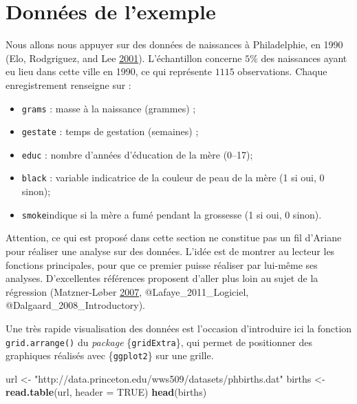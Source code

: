 \documentclass[
  11pt,
]{book}
\newenvironment{Shaded}{\begin{snugshade}}{\end{snugshade}}
\newcommand{\DataTypeTok}[1]{\textcolor[rgb]{0.13,0.29,0.53}{#1}}
\newcommand{\KeywordTok}[1]{\textcolor[rgb]{0.13,0.29,0.53}{\textbf{#1}}}
\newcommand{\NormalTok}[1]{#1}
\newcommand{\OtherTok}[1]{\textcolor[rgb]{0.56,0.35,0.01}{#1}}
\newcommand{\StringTok}[1]{\textcolor[rgb]{0.31,0.60,0.02}{#1}}
\providecommand{\tightlist}{%
  \setlength{\itemsep}{0pt}\setlength{\parskip}{0pt}}
\numberwithin{equation}{section}
\numberwithin{countremarque}{section}
\begin{document}
\hypertarget{regressions_donnees}{%
\section{Données de l'exemple}\label{regressions_donnees}}

Nous allons nous appuyer sur des données de naissances à Philadelphie, en 1990 (Elo, Rodgriguez, and Lee \protect\hyperlink{ref-Elo_2001_Racial}{2001}). L'échantillon concerne \(5\%\) des naissances ayant eu lieu dans cette ville en 1990, ce qui représente \(1115\) observations. Chaque enregistrement renseigne sur :

\begin{itemize}
\tightlist
\item
  \texttt{grams} : masse à la naissance (grammes) ;
\item
  \texttt{gestate} : temps de gestation (semaines) ;
\item
  \texttt{educ} : nombre d'années d'éducation de la mère (0--17);
\item
  \texttt{black} : variable indicatrice de la couleur de peau de la mère (1 si oui, 0 sinon);
\item
  \texttt{smoke}indique si la mère a fumé pendant la grossesse (1 si oui, 0 sinon).
\end{itemize}

Attention, ce qui est proposé dans cette section ne constitue pas un fil d'Ariane pour réaliser une analyse sur des données. L'idée est de montrer au lecteur les fonctions principales, pour que ce premier puisse réaliser par lui-même ses analyses. D'excellentes références proposent d'aller plus loin au sujet de la régression (Matzner-Løber \protect\hyperlink{ref-Matzner_2007_Regression}{2007}, @Lafaye\_2011\_Logiciel, @Dalgaard\_2008\_Introductory).

Une très rapide visualisation des données est l'occasion d'introduire ici la fonction \texttt{grid.arrange()} du \emph{package} \{\texttt{gridExtra}\}, qui permet de positionner des graphiques réalisés avec \{\texttt{ggplot2}\} sur une grille.

\begin{Shaded}
\begin{Highlighting}[]
\NormalTok{url \textless{}{-}}\StringTok{ "http://data.princeton.edu/wws509/datasets/phbirths.dat"}
\NormalTok{births \textless{}{-}}\StringTok{ }\KeywordTok{read.table}\NormalTok{(url, }\DataTypeTok{header =} \OtherTok{TRUE}\NormalTok{)}
\KeywordTok{head}\NormalTok{(births)}
\end{Highlighting}
\end{Shaded}
\end{document}
